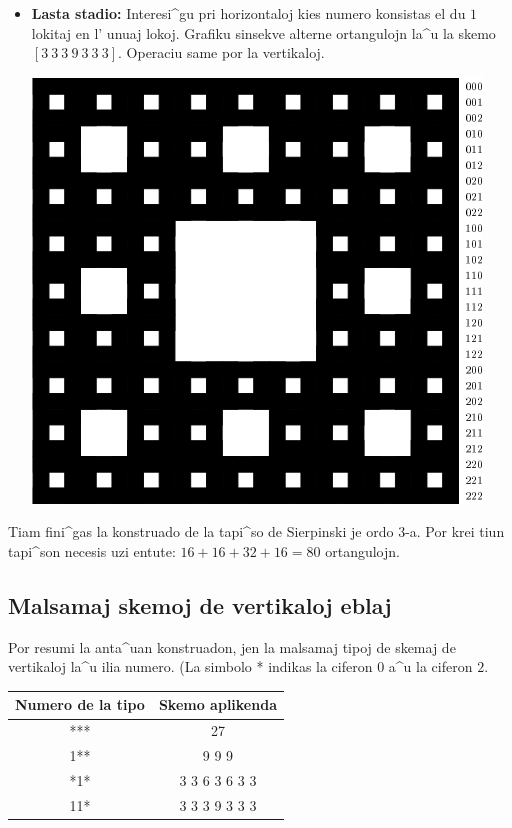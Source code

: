 \begin{itemize}
\begin{center}
\end{center}
\item [\textbullet] \textbf{Lasta stadio:} Interesi^gu pri
  horizontaloj kies numero konsistas el du $1$ lokitaj en l' unuaj
  lokoj.  Grafiku sinsekve alterne ortangulojn la^u la skemo $[3\ 3\
  3\ 9\ 3\ 3\ 3]$.  Operaciu same por la vertikaloj.
\begin{center}
\includegraphics{bildoj/menger-schema06.png}
\end{center}
\end{itemize}
Tiam fini^gas la konstruado de la tapi^so de Sierpinski je ordo $3$-a.
Por krei tiun tapi^son necesis uzi entute: $16+16+32+16=80$
ortangulojn.

\subsection{Malsamaj skemoj de vertikaloj eblaj}

Por resumi la anta^uan konstruadon, jen la malsamaj tipoj de skemaj de
vertikaloj la^u ilia numero.  (La simbolo * indikas la ciferon $0$ a^u
la ciferon $2$.
\begin{center}
  \begin{tabular}{|c|c|}
    \hline
    Numero de la tipo & Skemo aplikenda \\
    \hline
    *** & 27 \\ 
    \hline
    1** &  9 9 9 \\
    \hline
    *1* & 3 3 6 3 6 3 3\\
    \hline
    11* & 3 3 3 9 3 3 3\\
    \hline
  \end{tabular}
\end{center}

